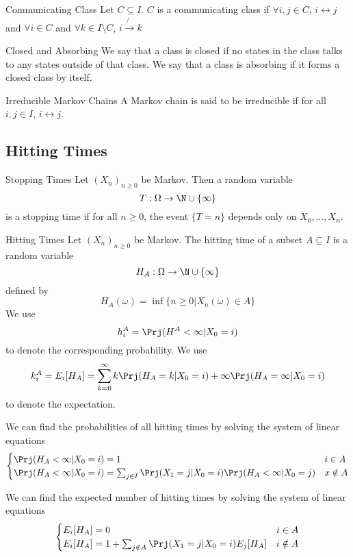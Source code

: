 \documentclass[a4paper]{article}
\begin{document}
\begin{defn}{Communicating Class}{} Let $C\subseteq I$. $C$ is a communicating class if $\forall i,j\in C$, $i\leftrightarrow j$ and $\forall i\in C$ and $\forall k\in I\setminus C$, $i\not{\rightarrow} k$ 
\end{defn}

\begin{defn}{Closed and Absorbing}{} We say that a class is closed if no states in the class talks to any states outside of that class. We say that a class is absorbing if it forms a closed class by itself. 
\end{defn}

\begin{defn}{Irreducible Markov Chains}{} A Markov chain is said to be irreducible if for all $i,j\in I$, $i\leftrightarrow j$. 
\end{defn}

\subsection{Hitting Times}
\begin{defn}{Stopping Times}{} Let $(X_n)_{n\geq 0}$ be Markov. Then a random variable $$T:\Omega\to\N\cup\{\infty\}$$ is a stopping time if for all $n\geq 0$, the event $\{T=n\}$ depends only on $X_0,\dots,X_n$. 
\end{defn}

\begin{defn}{Hitting Times}{} Let $(X_n)_{n\geq 0}$ be Markov. The hitting time of a subset $A\subseteq I$ is a random variable $$H_A:\Omega\to\N\cup\{\infty\}$$ defined by $$H_A(\omega)=\inf\{n\geq 0|X_n(\omega)\in A\}$$ We use $$h_i^A=\Prj(H^A<\infty|X_0=i)$$ to denote the corresponding probability. We use $$k_i^A=E_i[H_A]=\sum_{k=0}^\infty k\Prj(H_A=k|X_0=i)+\infty\Prj(H_A=\infty|X_0=i)$$ to denote the expectation. 
\end{defn}

\begin{prp}{}{} We can find the probabilities of all hitting times by solving the system of linear equations $$\begin{cases}
\Prj(H_A<\infty|X_0=i)=1 & i\in A\\
\Prj(H_A<\infty|X_0=i)=\sum_{j\in I}\Prj(X_1=j|X_0=i)\Prj(H_A<\infty|X_0=j) & x\notin A
\end{cases}$$
\end{prp}

\begin{prp}{}{} We can find the expected number of hitting times by solving the system of linear equations $$\begin{cases}
E_i[H_A]=0 & i\in A\\
E_i[H_A]=1+\sum_{j\notin A}\Prj(X_1=j|X_0=i)E_j[H_A] & i\notin A
\end{cases}$$
\end{prp}
\end{document}
